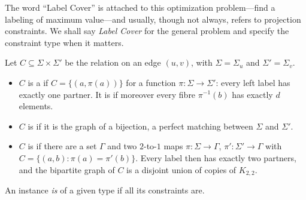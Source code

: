 The word ``Label Cover'' is attached to this optimization problem---find a labeling of maximum value---and
usually, though not always, refers to projection constraints.  We shall say \emph{Label Cover} for the
general problem and specify the constraint type when it matters.

\begin{definition}\label{def:types}
Let $C\subseteq\Sigma\times\Sigma'$ be the relation on an edge $(u,v)$, with $\Sigma=\Sigma_u$ and $\Sigma'=\Sigma_v$.
\begin{itemize}
  \item $C$ is a  if $C=\{(a,\pi(a))\}$ for a function $\pi\colon\Sigma\to\Sigma'$: every left label has
        exactly one partner.  It is  if moreover every fibre $\pi^{-1}(b)$ has exactly $d$ elements.
  \item $C$ is  if it is the graph of a bijection, \ie a perfect matching between $\Sigma$ and $\Sigma'$.
  \item $C$ is  if there are a set $\Gamma$ and two $2$-to-$1$ maps $\pi\colon\Sigma\to\Gamma$,
        $\pi'\colon\Sigma'\to\Gamma$ with $C=\{(a,b):\pi(a)=\pi'(b)\}$.  Every label then has exactly two partners,
        and the bipartite graph of $C$ is a disjoint union of copies of $K_{2,2}$.
\end{itemize}
An instance \emph{is} of a given type if all its constraints are.
\end{definition}

